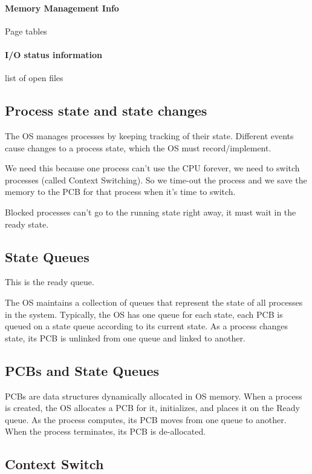 \documentclass{article}
\begin{document}
\paragraph{Memory Management Info} Page tables
\paragraph{I\slash O status information} list of open files


\subsection{Process state and state changes}

The OS manages processes by keeping tracking of their state. Different events cause changes to a process state, which the OS must record\slash implement.

We need this because one process can't use the CPU forever, we need to switch processes (called Context Switching). So we time-out the process and we save the memory to the PCB for that process when it's time to switch.

Blocked processes can't go to the running state right away, it must wait in the ready state.

\subsection{State Queues}

This is the ready queue.

The OS maintains a collection of queues  that represent the state of all processes in the system. Typically, the OS has one queue for each state, each PCB is queued on a state queue according to its current state. As a process changes state, its PCB is unlinked from one queue and linked to another.

\subsection{PCBs and State Queues}

PCBs are data structures dynamically allocated in OS memory. When a process is created, the OS allocates a PCB for it, initializes, and places it on the Ready queue. As the process computes, its PCB moves from one queue to another. When the process terminates, its PCB is de-allocated.

\subsection{Context Switch}
\end{document}
